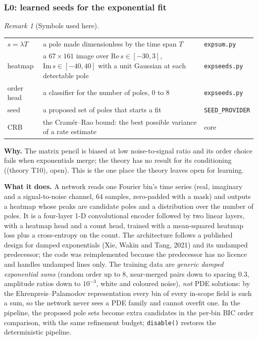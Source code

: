 \documentclass[11pt]{article}
\theoremstyle{plain}
\theoremstyle{definition}
\theoremstyle{remark}
\newtheorem{remark}[theorem]{Remark}
\newcommand{\thy}[1]{\textcolor{cG}{\textsf{\footnotesize(theory #1)}}}
\newenvironment{symbols}{\begin{remark}[Symbols used here]}{\end{remark}}
\begin{document}
\subsubsection{L0: learned seeds for the exponential fit}\label{sec:l0}
\begin{symbols}
\begin{tabular}{@{}L{2.6cm}L{6.0cm}L{4.3cm}@{}}
$s=\lambda T$ & a pole made dimensionless by the time span $T$ & \texttt{expsum.py}\\
heatmap & a $67\times161$ image over $\mathrm{Re}\,s\in[-30,3]$, $\mathrm{Im}\,s\in[-40,40]$ with a unit Gaussian at each detectable pole & \texttt{expseeds.py}\\
order head & a classifier for the number of poles, $0$ to $8$ & \texttt{expseeds.py}\\
seed & a proposed set of poles that starts a fit & \texttt{SEED\_PROVIDER}\\
CRB & the Cram\'er--Rao bound: the best possible variance of a rate estimate & core\\
\end{tabular}
\end{symbols}
\textbf{Why.} The matrix pencil is biased at low noise-to-signal ratio and its order choice fails when exponentials merge; the theory has no result for its conditioning (\thy{T10}, open). This is the one place the theory leaves open for learning.

\textbf{What it does.} A network reads one Fourier bin's time series (real, imaginary and a signal-to-noise channel, $64$ samples, zero-padded with a mask) and outputs a heatmap whose peaks are candidate poles and a distribution over the number of poles. It is a four-layer 1-D convolutional encoder followed by two linear layers, with a heatmap head and a count head, trained with a mean-squared heatmap loss plus a cross-entropy on the count. The architecture follows a published design for damped exponentials (Xie, Wakin and Tang, 2021) and its undamped predecessor; the code was reimplemented because the predecessor has no licence and handles undamped lines only. The training data are \emph{generic damped exponential sums} (random order up to $8$, near-merged pairs down to spacing $0.3$, amplitude ratios down to $10^{-3}$, white and coloured noise), \emph{not} PDE solutions: by the Ehrenpreis--Palamodov representation every bin of every in-scope field is such a sum, so the network never sees a PDE family and cannot overfit one. In the pipeline, the proposed pole sets become extra candidates in the per-bin BIC order comparison, with the same refinement budget; \texttt{disable()} restores the deterministic pipeline.
\end{document}
